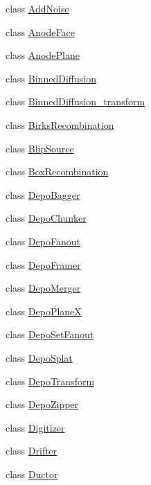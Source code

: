 \begin{DoxyCompactItemize}
\item 
class \hyperlink{class_wire_cell_1_1_gen_1_1_add_noise}{Add\+Noise}
\item 
class \hyperlink{class_wire_cell_1_1_gen_1_1_anode_face}{Anode\+Face}
\item 
class \hyperlink{class_wire_cell_1_1_gen_1_1_anode_plane}{Anode\+Plane}
\item 
class \hyperlink{class_wire_cell_1_1_gen_1_1_binned_diffusion}{Binned\+Diffusion}
\item 
class \hyperlink{class_wire_cell_1_1_gen_1_1_binned_diffusion__transform}{Binned\+Diffusion\+\_\+transform}
\item 
class \hyperlink{class_wire_cell_1_1_gen_1_1_birks_recombination}{Birks\+Recombination}
\item 
class \hyperlink{class_wire_cell_1_1_gen_1_1_blip_source}{Blip\+Source}
\item 
class \hyperlink{class_wire_cell_1_1_gen_1_1_box_recombination}{Box\+Recombination}
\item 
class \hyperlink{class_wire_cell_1_1_gen_1_1_depo_bagger}{Depo\+Bagger}
\item 
class \hyperlink{class_wire_cell_1_1_gen_1_1_depo_chunker}{Depo\+Chunker}
\item 
class \hyperlink{class_wire_cell_1_1_gen_1_1_depo_fanout}{Depo\+Fanout}
\item 
class \hyperlink{class_wire_cell_1_1_gen_1_1_depo_framer}{Depo\+Framer}
\item 
class \hyperlink{class_wire_cell_1_1_gen_1_1_depo_merger}{Depo\+Merger}
\item 
class \hyperlink{class_wire_cell_1_1_gen_1_1_depo_plane_x}{Depo\+PlaneX}
\item 
class \hyperlink{class_wire_cell_1_1_gen_1_1_depo_set_fanout}{Depo\+Set\+Fanout}
\item 
class \hyperlink{class_wire_cell_1_1_gen_1_1_depo_splat}{Depo\+Splat}
\item 
class \hyperlink{class_wire_cell_1_1_gen_1_1_depo_transform}{Depo\+Transform}
\item 
class \hyperlink{class_wire_cell_1_1_gen_1_1_depo_zipper}{Depo\+Zipper}
\item 
class \hyperlink{class_wire_cell_1_1_gen_1_1_digitizer}{Digitizer}
\item 
class \hyperlink{class_wire_cell_1_1_gen_1_1_drifter}{Drifter}
\item 
class \hyperlink{class_wire_cell_1_1_gen_1_1_ductor}{Ductor}

\end{DoxyCompactItemize}
